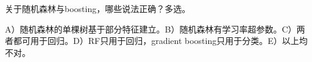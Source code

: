关于随机森林与boosting，哪些说法正确？多选。


A）随机森林的单棵树基于部分特征建立。B）随机森林有学习率超参数。C）两者都可用于回归。D）RF只用于回归，gradient boosting只用于分类。E）以上均不对。
